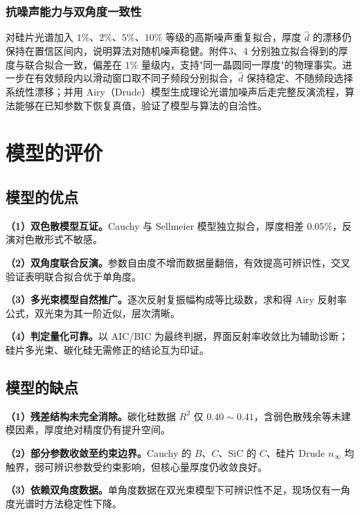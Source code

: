 \documentclass[withoutpreface,bwprint]{cumcmthesis}
\begin{document}
\subsubsection{抗噪声能力与双角度一致性}

对硅片光谱加入 $1\%$、$2\%$、$5\%$、$10\%$ 等级的高斯噪声重复拟合，厚度 $\hat d$ 的漂移仍保持在置信区间内，说明算法对随机噪声稳健。附件3、4 分别独立拟合得到的厚度与联合拟合一致，偏差在 $1\%$ 量级内，支持"同一晶圆同一厚度"的物理事实。进一步在有效频段内以滑动窗口取不同子频段分别拟合，$\hat d$ 保持稳定、不随频段选择系统性漂移；并用 Airy（Drude）模型生成理论光谱加噪声后走完整反演流程，算法能够在已知参数下恢复真值，验证了模型与算法的自洽性。


\section{模型的评价}

\subsection{模型的优点}

\textbf{（1）双色散模型互证。}Cauchy 与 Sellmeier 模型独立拟合，厚度相差 $0.05\%$，反演对色散形式不敏感。

\textbf{（2）双角度联合反演。}参数自由度不增而数据量翻倍，有效提高可辨识性，交叉验证表明联合拟合优于单角度。

\textbf{（3）多光束模型自然推广。}逐次反射复振幅构成等比级数，求和得 Airy 反射率公式，双光束为其一阶近似，层次清晰。

\textbf{（4）判定量化可靠。}以 AIC/BIC 为最终判据，界面反射率收敛比为辅助诊断；硅片多光束、碳化硅无需修正的结论互为印证。

\subsection{模型的缺点}

\textbf{（1）残差结构未完全消除。}碳化硅数据 $R^2$ 仅 $0.40\sim0.41$，含弱色散残余等未建模因素，厚度绝对精度仍有提升空间。

\textbf{（2）部分参数收敛至约束边界。}Cauchy 的 $B$、$C$、SiC 的 $C$、硅片 Drude $n_\infty$ 均触界，弱可辨识参数受约束影响，但核心量厚度仍收敛良好。

\textbf{（3）依赖双角度数据。}单角度数据在双光束模型下可辨识性不足，现场仅有一角度光谱时方法稳定性下降。
\end{document}
